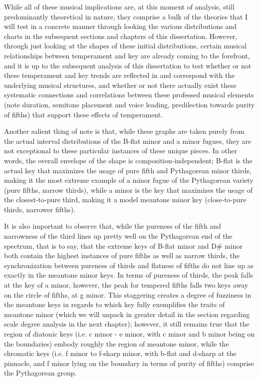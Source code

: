While all of these musical implications are, at this moment of analysis,
still predominantly theoretical in nature, they comprise a bulk of the
theories that I will test in a concrete manner through looking the
various distributions and charts in the subsequent sections and chapters
of this dissertation. However, through just looking at the shapes of
these initial distributions, certain musical relationships between
temperament and key are already coming to the forefront, and it is up to
the subsequent analysis of this dissertation to test whether or not
these temperament and key trends are reflected in and correspond with
the underlying musical structures, and whether or not there actually
exist these systematic connections and correlations between these
professed musical elements (note duration, semitone placement and voice
leading, predilection towards purity of fifths) that support these
effects of temperament.

Another salient thing of note is that, while these graphs are taken
purely from the actual interval distributions of the B-flat minor and a
minor fugues, they are not exceptional to these particular instances of
these unique pieces. In other words, the overall envelope of the shape
is composition-independent; B-flat is the actual key that maximizes the
usage of pure fifth and Pythagorean minor thirds, making it the most
extreme example of a minor fugue of the Pythagorean variety (pure
fifths, narrow thirds), while a minor is the key that maximizes the
usage of the closest-to-pure third, making it a model meantone minor key
(close-to-pure thirds, narrower fifths).

It is also important to observe that, while the pureness of the fifth
and narrowness of the third lines up pretty well on the Pythagorean end
of the spectrum, that is to say, that the extreme keys of B-flat minor
and D\# minor both contain the highest instances of pure fifths as well
as narrow thirds, the synchronization between pureness of thirds and
flatness of fifths do not line up as exactly in the meantone minor keys.
In terms of pureness of thirds, the peak falls at the key of a minor,
however, the peak for tempered fifths falls two keys away on the circle
of fifths, at g minor. This staggering creates a degree of fuzziness in
the meantone keys in regards to which key fully exemplifies the traits
of meantone minor (which we will unpack in greater detail in the section
regarding scale degree analysis in the next chapter); however, it still
remains true that the region of diatonic keys (i.e. c minor - e minor,
with c minor and b minor being on the boundaries) embody roughly the
region of meantone minor, while the chromatic keys (i.e. f minor to
f-sharp minor, with b-flat and d-sharp at the pinnacle, and f minor
lying on the boundary in terms of purity of fifths) comprise the
Pythagorean group.


